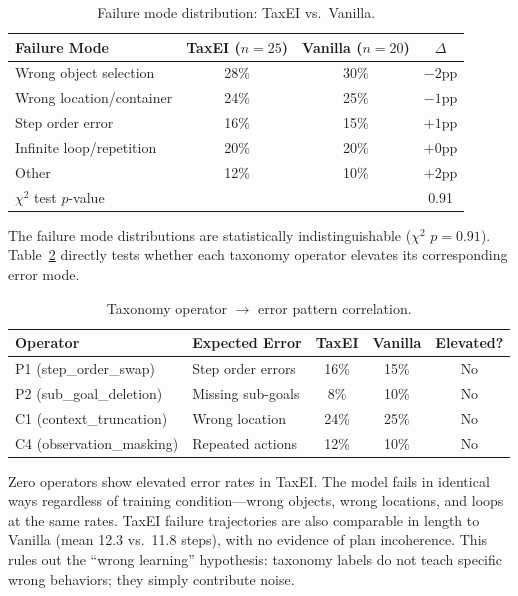 \documentclass[11pt,a4paper]{article}
\begin{document}
\begin{table}[h]
\centering
\caption{Failure mode distribution: TaxEI vs.\ Vanilla.}
\label{tab:failure}
\begin{tabular}{lccc}
\toprule
\textbf{Failure Mode} & \textbf{TaxEI ($n{=}25$)} & \textbf{Vanilla ($n{=}20$)} & $\Delta$ \\
\midrule
Wrong object selection & 28\% & 30\% & $-2$pp \\
Wrong location/container & 24\% & 25\% & $-1$pp \\
Step order error & 16\% & 15\% & $+1$pp \\
Infinite loop/repetition & 20\% & 20\% & $+0$pp \\
Other & 12\% & 10\% & $+2$pp \\
\midrule
$\chi^2$ test $p$-value & & & 0.91 \\
\bottomrule
\end{tabular}
\end{table}

The failure mode distributions are statistically indistinguishable ($\chi^2$ $p{=}0.91$).
Table~\ref{tab:opcorr} directly tests whether each taxonomy operator elevates its corresponding error mode.

\begin{table}[h]
\centering
\caption{Taxonomy operator $\to$ error pattern correlation.}
\label{tab:opcorr}
\begin{tabular}{llccc}
\toprule
\textbf{Operator} & \textbf{Expected Error} & \textbf{TaxEI} & \textbf{Vanilla} & \textbf{Elevated?} \\
\midrule
P1 (step\_order\_swap) & Step order errors & 16\% & 15\% & No \\
P2 (sub\_goal\_deletion) & Missing sub-goals & 8\% & 10\% & No \\
C1 (context\_truncation) & Wrong location & 24\% & 25\% & No \\
C4 (observation\_masking) & Repeated actions & 12\% & 10\% & No \\
\bottomrule
\end{tabular}
\end{table}

Zero operators show elevated error rates in TaxEI.
The model fails in identical ways regardless of training condition---wrong objects, wrong locations, and loops at the same rates.
TaxEI failure trajectories are also comparable in length to Vanilla (mean 12.3 vs.\ 11.8 steps), with no evidence of plan incoherence.
This rules out the ``wrong learning'' hypothesis: taxonomy labels do not teach specific wrong behaviors; they simply contribute noise.
\end{document}
